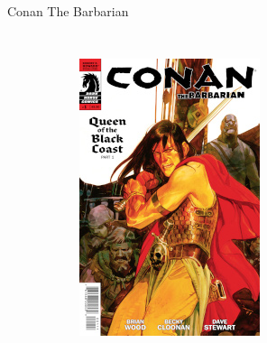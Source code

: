 \begin{frame}{Conan The Barbarian}
	\begin{columns}
		\begin{figure}[htp]
			\centering
			\begin{subfigure}[b]{0.23\textwidth}
				\includegraphics[width=\textwidth]{img/DH-CTB-01}
			\end{subfigure}
			~
			\begin{subfigure}[b]{0.23\textwidth}

\end{subfigure}
\end{figure}
\end{columns}
\end{frame}
